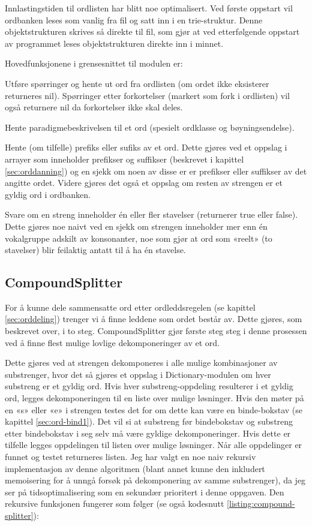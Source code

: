 Innlastingstiden til ordlisten har blitt noe optimalisert. Ved første oppstart vil ordbanken leses som vanlig fra fil og satt inn i en trie-struktur. Denne objektstrukturen skrives så direkte til fil, som gjør at ved etterfølgende oppstart av programmet leses objektstrukturen direkte inn i minnet.

Hovedfunksjonene i grensesnittet til modulen er: 
\begin{items}
\item Utføre spørringer og hente ut ord fra ordlisten (om ordet ikke eksisterer returneres nil). Spørringer etter forkortelser (markert som fork i ordlisten) vil også returnere nil da forkortelser ikke skal deles. 
\item Hente paradigmebeskrivelsen til et ord (spesielt ordklasse og bøyningsendelse). 
\item Hente (om tilfelle) prefiks eller sufiks av et ord. Dette gjøres ved et oppslag i arrayer som inneholder prefikser og suffikser (beskrevet i kapittel \ref{sec:orddanning}) og en sjekk om noen av disse er er prefikser eller suffikser av det angitte ordet. Videre gjøres det også et oppslag om resten av strengen er et gyldig ord i ordbanken. 
\item Svare om en streng inneholder én eller fler stavelser (returnerer true eller false). Dette gjøres noe naivt ved en sjekk om strengen inneholder mer enn én vokalgruppe adskilt av konsonanter, noe som gjør at ord som «reelt» (to stavelser) blir feilaktig antatt til å ha én stavelse.
\end{items}

\subsection{CompoundSplitter}

For å kunne dele sammensatte ord etter ordleddsregelen (se kapittel \ref{sec:orddeling}) trenger vi å finne leddene som ordet består av. Dette gjøres, som beskrevet over, i to steg. CompoundSplitter gjør første steg steg i denne prosessen ved å finne flest mulige lovlige dekomponeringer av et ord.

Dette gjøres ved at strengen dekomponeres i alle mulige kombinasjoner av substrenger, hvor det så gjøres et oppslag i Dictionary-modulen om hver substreng er et gyldig ord. Hvis hver substreng-oppdeling resulterer i et gyldig ord, legges dekomponeringen til en liste over mulige løsninger. Hvis den møter på en «s» eller «e» i strengen testes det for om dette kan være en binde-bokstav (se kapittel \ref{sec:ord-bind1}). Det vil si at substreng før bindebokstav og substreng etter bindebokstav i seg selv må være gyldige dekomponeringer. Hvis dette er tilfelle legges oppdelingen til listen over mulige løsninger. Når alle oppdelinger er funnet og testet returneres listen. Jeg har valgt en noe naiv rekursiv implementasjon av denne algoritmen (blant annet kunne den inkludert memoisering for å unngå forsøk på dekomponering av samme substrenger), da jeg ser på tidsoptimalisering som en sekundær prioritert i denne oppgaven. Den rekursive funksjonen fungerer som følger (se også kodesnutt \ref{listing:compound-splitter}):

